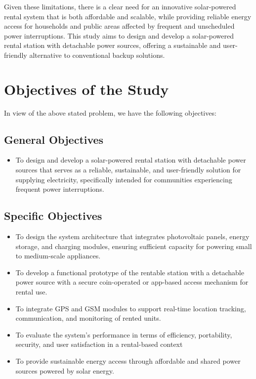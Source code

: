 {Given these limitations, there is a clear need for an innovative solar-powered rental system that is both affordable and scalable, while providing reliable energy access for households and public areas affected by frequent and unscheduled power interruptions. This study aims to design and develop a solar-powered rental station with detachable power sources, offering a sustainable and user-friendly alternative to conventional backup solutions.

\section{Objectives of the Study}

In view of the above stated problem, we have the following objectives:
\subsection{General Objectives}
\begin{itemize}
	\item To design and develop a solar-powered rental station with detachable power sources that serves as a reliable, sustainable, and user-friendly solution for supplying electricity, specifically intended for communities experiencing frequent power interruptions.
\end{itemize}
\subsection{Specific Objectives}
\begin{itemize}
	\item To design the system architecture that integrates photovoltaic panels, energy storage, and charging modules, ensuring sufficient capacity for powering small to medium-scale appliances.
	\item To develop a functional prototype of the rentable station with a detachable power source with a secure coin-operated or app-based access mechanism for rental use.
	\item To integrate GPS and GSM modules to support real-time location tracking, communication, and monitoring of rented units.
	\item To evaluate the system’s performance in terms of efficiency, portability, security, and user satisfaction in a rental-based context
	\item To provide sustainable energy access through affordable and shared power sources powered by solar energy.
\end{itemize}

}

